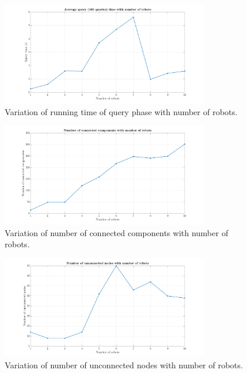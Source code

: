 \documentclass[12pt,a4paper, onecolumn]{IEEEtran}
\begin{document}
\begin{figure}[htbp]
  \centering
  \includegraphics[width=0.8\textwidth, trim={4cm 0 4cm 0},clip]{qT_plot.png}
  \caption{Variation of running time of query phase with number of robots. }
  \label{fig:qT}
\end{figure}

\begin{figure}[htbp]
  \centering
  \includegraphics[width=0.8\textwidth, trim={4cm 0 4cm 0},clip]{cc_plot.png}
  \caption{Variation of number of connected components with number of robots. }
  \label{fig:cc}
\end{figure}

\begin{figure}[htbp]
  \centering
  \includegraphics[width=0.8\textwidth, trim={4cm 0 4cm 0},clip]{ccn_plot.png}
  \caption{Variation of number of unconnected nodes with number of robots. }
  \label{fig:ccn}
\end{figure}



\end{document}
